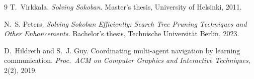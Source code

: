 \documentclass[10pt,a4paper]{article}
\begin{document}
\begin{footnotesize}
\begin{thebibliography}{9}
T.~Virkkala.
\newblock \emph{Solving Sokoban}.
\newblock Master's thesis, University of Helsinki, 2011.

N.~S. Peters.
\newblock \emph{Solving Sokoban Efficiently: Search Tree Pruning Techniques and Other
Enhancements}.
\newblock Bachelor's thesis, Technische Universität Berlin, 2023.

D.~Hildreth and S.~J. Guy.
\newblock Coordinating multi-agent navigation by learning communication.
\newblock \emph{Proc.\ ACM on Computer Graphics and Interactive Techniques}, 2(2), 2019.

\end{thebibliography}
\end{footnotesize}

\clearpage

\end{document}
